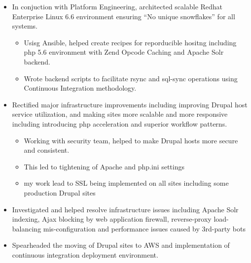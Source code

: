 \documentclass[11pt,a4paper,sans]{moderncv}   %
\begin{document}
{\begin{itemize}
\begin{itemize}
\begin{itemize}
      \item Was able to document drupal and ensure consistency of standards for 26 Drupal sites utilizing continuous integration automation with Jenkins.
      \end{itemize}
    \item In conjuction with Platform Engineering, architected scalable Redhat Enterprise Linux 6.6 environment ensuring “No unique snowflakes” for all systems.
      \begin{itemize}%
      \item Usisg Ansible, helped create recipes for reporducible hositng including php 5.6 environment with Zend Opcode Caching and Apache Solr backend.
      \item Wrote backend scripts to facilitate rsync and sql-sync operations using Continuous Integration methodology.
      \end{itemize}
    \item Rectified major infrastructure improvements including improving Drupal host service utilization, and making sites more scalable and more responsive including introducing php acceleration and superior workflow patterns.
      \begin{itemize}%
      \item  Working with security team, helped to make Drupal hosts more secure and consistent.
      \item This led to tightening of Apache and php.ini settings
      \item my work lead to SSL being implemented on all sites including some production Drupal sites
      \end{itemize}
    \item Investigated and helped resolve infrastructure issues including Apache Solr indexing, Ajax blocking by web application firewall, reverse-proxy load-balancing mis-configuration and performance issues caused by 3rd-party bots
    \item Spearheaded the moving of Drupal sites to AWS and implementation of continuous integration deployment environment.
    \end{itemize}
  \end{itemize}
}
\end{document}
